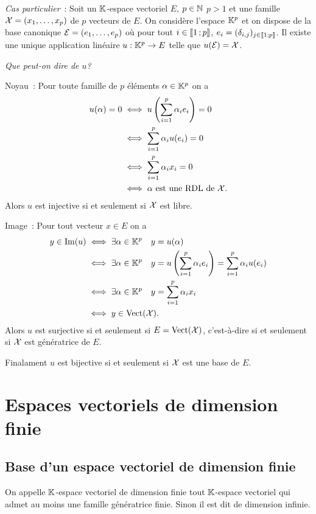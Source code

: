 \emph{Cas particulier}~: Soit un $\mathbb{K}$-espace vectoriel $E$, $p \in \mathbb{N}$ $p>1$ et une famille $\mathcal{X}=(x_1, \ldots, x_p)$ de $p$ vecteurs de $E$. On considère l'espace $\mathbb{K}^p$ et on dispose de la base canonique $\mathcal{E}=(e_1, \ldots, e_p)$ où pour tout $i \in \mathopen{\llbracket}1\mathclose{}\mathpunct{};p\mathclose{\rrbracket}$, $e_i = (\delta_{i,j})_{j \in \mathopen{\llbracket}1\mathclose{}\mathpunct{};p\mathclose{\rrbracket}}$. Il existe une unique application linéaire $u : \mathbb{K}^p \rightarrow E$ telle que $u(\mathcal{E})=\mathcal{X}$.

\emph{Que peut-on dire de $u$?}

Noyau~: Pour toute famille de $p$ éléments $\alpha \in \mathbb{K}^p$ on a
\begin{align}
  u(\alpha)=0 &\iff u\left(\sum_{i=1}^p \alpha_i e_i \right)=0\\
  &\iff \sum_{i=1}^p \alpha_i u(e_i) =0\\
  &\iff \sum_{i=1}^p \alpha_i x_i =0\\
  &\iff \alpha \text{~est une RDL de } \mathcal{X}.
\end{align}
Alors $u$ est injective si et seulement si $\mathcal{X}$ est libre.

Image~: Pour tout vecteur $x \in E$ on a
\begin{align}
  y \in \operatorname{Im}(u) &\iff \exists \alpha \in \mathbb{K}^p \quad y=u(\alpha)\\
  &\iff \exists \alpha \in \mathbb{K}^p \quad y=u\left(\sum_{i=1}^p \alpha_i e_i \right)= \sum_{i=1}^p \alpha_i u(e_i) \\
  &\iff \exists \alpha \in \mathbb{K}^p \quad y=\sum_{i=1}^p \alpha_i x_i\\
  &\iff y \in \operatorname{Vect}(\mathcal{X}).
\end{align}
Alors $u$ est surjective si et seulement si $E=\operatorname{Vect}(\mathcal{X})$, c'est-à-dire si et seulement si $\mathcal{X}$ est génératrice de $E$.

Finalament $u$ est bijective si et seulement si $\mathcal{X}$ est une base de $E$.

\section{Espaces vectoriels de dimension finie}

\subsection{Base d'un espace vectoriel de dimension finie}

\begin{defdef}
  On appelle $\mathbb{K}$-espace vectoriel de dimension finie tout $\mathbb{K}$-espace vectoriel qui admet au moins une famille génératrice finie. Sinon il est dit de dimension infinie.
\end{defdef}

